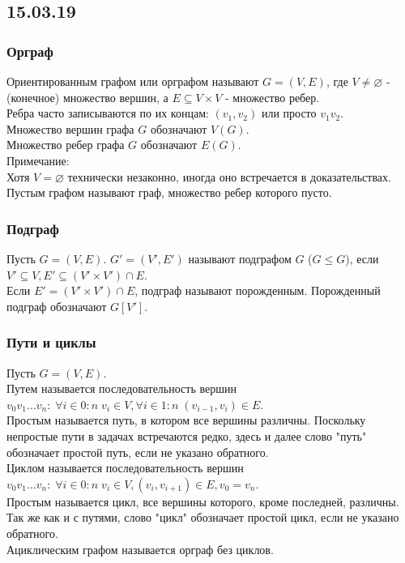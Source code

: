 \subsection{15.03.19}
\subsubsection{Орграф}
Ориентированным графом или орграфом называют $G = (V, E)$, где $V \not= \varnothing$ - (конечное) множество вершин, а $E \subseteq V \times V$ - множество ребер.\\
Ребра часто записываются по их концам: $(v_1, v_2)$ или просто $v_1v_2$.\\
Множество вершин графа $G$ обозначают $V(G)$.\\
Множество ребер графа $G$ обозначают $E(G)$.\\
Примечание: \\
Хотя $V = \varnothing$ технически незаконно, иногда оно встречается в доказательствах.\\
Пустым графом называют граф, множество ребер которого пусто.\\
\subsubsection{Подграф}
Пусть $G = (V, E)$. $G' = (V', E')$ называют подграфом $G$ ($G\leq G$), если $V' \subseteq V, E' \subseteq (V' \times V') \cap E$.\\
Если $E' = (V' \times V') \cap E$, подграф называют порожденным. Порожденный подграф обозначают $G[V']$.\\
\subsubsection{Пути и циклы}
Пусть $G = (V, E)$.\\
Путем называется последовательность вершин $v_0v_1...v_n: \; \forall i \in 0:n \; v_i \in V, \forall i \in 1:n \; (v_{i - 1}, v_i) \in E$.\\
Простым называется путь, в котором все вершины различны. Поскольку непростые пути в задачах встречаются редко, здесь и далее слово "путь" обозначает простой путь, если не указано обратного.\\
Циклом называется последовательность вершин $v_0v_1...v_n: \; \forall i \in 0:n \; v_i \in V, (v_i, v_{i + 1}) \in E, v_0 = v_n$.\\
Простым называется цикл, все вершины которого, кроме последней, различны. Так же как и с путями, слово "цикл" обозначает простой цикл, если не указано обратного.\\
Ациклическим графом называется орграф без циклов.

